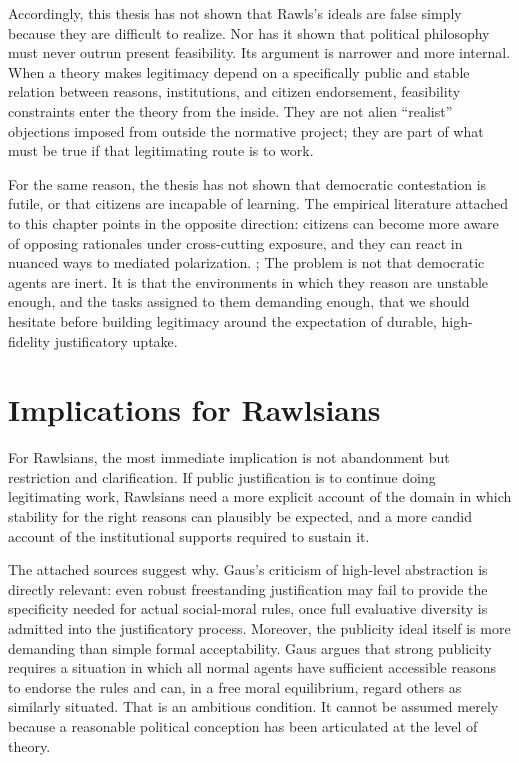 \documentclass[12pt]{report}
\begin{document}
Accordingly, this thesis has not shown that Rawls's ideals are false simply because they are difficult to realize. Nor has it shown that political philosophy must never outrun present feasibility. Its argument is narrower and more internal. When a theory makes legitimacy depend on a specifically public and stable relation between reasons, institutions, and citizen endorsement, feasibility constraints enter the theory from the inside. They are not alien \enquote{realist} objections imposed from outside the normative project; they are part of what must be true if that legitimating route is to work.

For the same reason, the thesis has not shown that democratic contestation is futile, or that citizens are incapable of learning. The empirical literature attached to this chapter points in the opposite direction: citizens can become more aware of opposing rationales under cross-cutting exposure, and they can react in nuanced ways to mediated polarization. \parencite[pp.~111--114]{mutz2002crosscutting}; \parencite[pp.~291--293]{levendusky2016media}
The problem is not that democratic agents are inert. It is that the environments in which they reason are unstable enough, and the tasks assigned to them demanding enough, that we should hesitate before building legitimacy around the expectation of durable, high-fidelity justificatory uptake.

\section{Implications for Rawlsians}

For Rawlsians, the most immediate implication is not abandonment but restriction and clarification. If public justification is to continue doing legitimating work, Rawlsians need a more explicit account of the domain in which stability for the right reasons can plausibly be expected, and a more candid account of the institutional supports required to sustain it.

The attached sources suggest why. Gaus's criticism of high-level abstraction is directly relevant: even robust freestanding justification may fail to provide the specificity needed for actual social-moral rules, once full evaluative diversity is admitted into the justificatory process. \parencite[p.~42]{gaus2011order}
Moreover, the publicity ideal itself is more demanding than simple formal acceptability. Gaus argues that strong publicity requires a situation in which all normal agents have sufficient accessible reasons to endorse the rules and can, in a free moral equilibrium, regard others as similarly situated. \parencite[p.~297]{gaus2011order}
That is an ambitious condition. It cannot be assumed merely because a reasonable political conception has been articulated at the level of theory.
\end{document}
